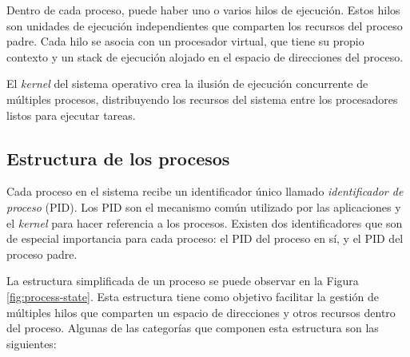 Dentro de cada proceso, puede haber uno o varios hilos de ejecución. Estos hilos son unidades de ejecución independientes que comparten los recursos del proceso padre. Cada hilo se asocia con un procesador virtual, que tiene su propio contexto y un stack de ejecución alojado en el espacio de direcciones del proceso.\par

El \textit{kernel} del sistema operativo crea la ilusión de ejecución concurrente de múltiples procesos, distribuyendo los recursos del sistema entre los procesadores listos para ejecutar tareas.\par

\subsection{Estructura de los procesos}
Cada proceso en el sistema recibe un identificador único llamado \textit{identificador de proceso} (PID). Los PID son el mecanismo común utilizado por las aplicaciones y el \textit{kernel} para hacer referencia a los procesos. Existen dos identificadores que son de especial importancia para cada proceso: el PID del proceso en sí, y el PID del proceso padre.

La estructura simplificada de un proceso se puede observar en la Figura \ref{fig:process-state}. Esta estructura tiene como objetivo facilitar la gestión de múltiples hilos que comparten un espacio de direcciones y otros recursos dentro del proceso. Algunas de las categorías que componen esta estructura son las siguientes:

